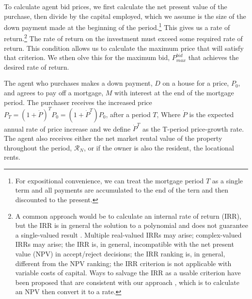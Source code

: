 To calculate agent bid prices, we first calculate the net present value of the purchase, then divide by the capital employed, which we assume is the size of the down payment made at the beginning of the period.\footnote{For expositional convenience, we can treat the mortgage period $T$ as a single term and all payments are accumulated to the end of the tern and then discounted to the present.} 
 This gives us a rate of return.\footnote{A common approach would be to calculate an internal rate of return (IRR), but  the IRR is in general the solution to a polynomial and does not guarantee a single-valued result \cite{robinsonOptimalTerminationIRR1996}. Multiple real-valued  IRRs may arise;  complex-valued IRRs may arise;  the IRR is, in general, incompatible with the net present value (NPV) in accept/reject decisions; the IRR ranking is, in general, different from the NPV ranking; the IRR criterion is not applicable with variable costs of capital. Ways to salvage the IRR as a usable criterion have been proposed that are consistent with our approach \cite{magniAverageInternalRate2010}, which is to calculate an NPV then convert it to a rate.} 
The rate of return on the investment must exceed some required rate of return. This condition allows us to calculate the maximum price that will satisfy that criterion.
We sthen olve this for  the maximum bid, $P_{max}^{bid}$ that achieves the desired rate of return. 

The agent who purchases makes a down payment, $D$ on a house for a price, $P_0$, and agrees to pay off a mortgage, $M$ with interest at the end of the mortgage period.  The purchaser  receives the increased price $P_T = (1 + \dot P)^TP_0 = (1+\dot P^T)P_0$, after a period $T$, Where $\dot P$ is the expected annual rate of price increase and we define $\dot P^T$ as the T-period  price-growth rate. The agent also receives either the net market rental value of the property throughout the period, $\mathcal{R}_N$, or if the owner is also the resident, the locational rents. 
 

